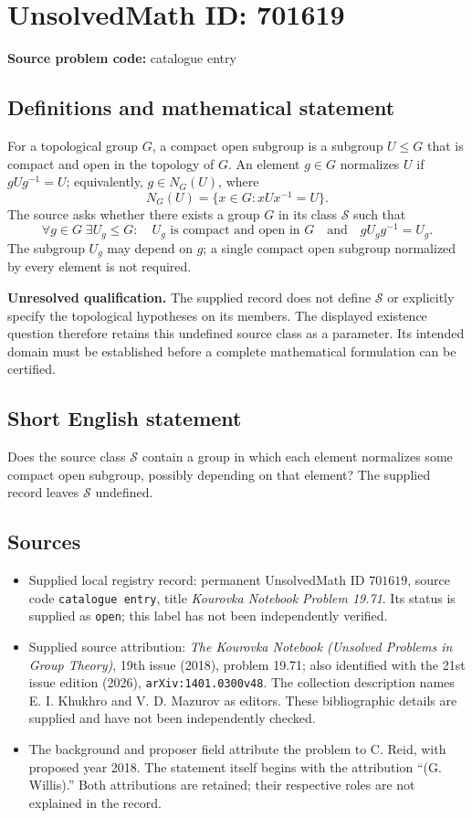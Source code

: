 \documentclass[11pt]{article}
\begin{document}
\section*{UnsolvedMath ID: 701619}
\textbf{Source problem code:} catalogue entry
\subsection{Definitions and mathematical statement}
For a topological group \(G\), a compact open subgroup is a subgroup \(U\leq G\) that is compact and open in the topology of \(G\). An element \(g\in G\) normalizes \(U\) if \(gUg^{-1}=U\); equivalently, \(g\in N_G(U)\), where
\[
N_G(U)=\{x\in G:xUx^{-1}=U\}.
\]
The source asks whether there exists a group \(G\) in its class \(\mathscr{S}\) such that
\[
\forall g\in G\;\exists U_g\leq G:\quad
U_g\text{ is compact and open in }G
\quad\text{and}\quad gU_gg^{-1}=U_g.
\]
The subgroup \(U_g\) may depend on \(g\); a single compact open subgroup normalized by every element is not required.

\textbf{Unresolved qualification.} The supplied record does not define \(\mathscr{S}\) or explicitly specify the topological hypotheses on its members. The displayed existence question therefore retains this undefined source class as a parameter. Its intended domain must be established before a complete mathematical formulation can be certified.
\subsection{Short English statement}
Does the source class \(\mathscr{S}\) contain a group in which each element normalizes some compact open subgroup, possibly depending on that element? The supplied record leaves \(\mathscr{S}\) undefined.
\subsection{Sources}
\begin{itemize}
\item Supplied local registry record: permanent UnsolvedMath ID \(701619\), source code \texttt{catalogue entry}, title \emph{Kourovka Notebook Problem 19.71}. Its status is supplied as \texttt{open}; this label has not been independently verified.
\item Supplied source attribution: \emph{The Kourovka Notebook (Unsolved Problems in Group Theory)}, 19th issue (2018), problem 19.71; also identified with the 21st issue edition (2026), \texttt{arXiv:1401.0300v48}. The collection description names E. I. Khukhro and V. D. Mazurov as editors. These bibliographic details are supplied and have not been independently checked.
\item The background and proposer field attribute the problem to C. Reid, with proposed year 2018. The statement itself begins with the attribution ``(G. Willis).'' Both attributions are retained; their respective roles are not explained in the record.
\end{itemize}
\end{document}
